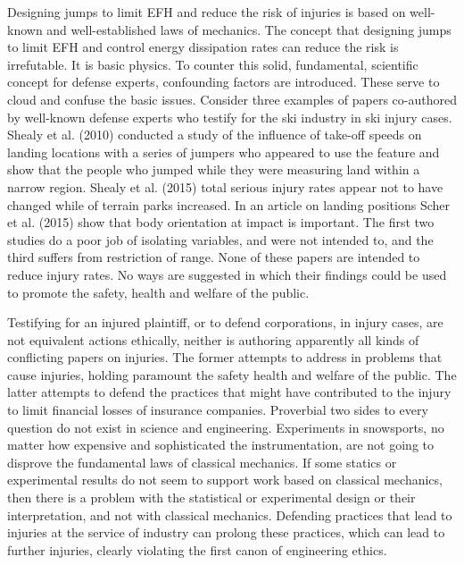 \documentclass{article}
\begin{document}
Designing jumps to limit EFH and reduce the risk of injuries is based on well-known and well-established laws of mechanics. The concept that designing jumps to limit EFH and control energy dissipation rates can reduce the risk is irrefutable. It is basic physics. To counter this solid, fundamental, scientific concept for defense experts, confounding factors are introduced. These serve to cloud and confuse the basic issues. Consider three examples of papers co-authored by well-known defense experts who testify for the ski industry in ski injury cases. Shealy et al. (2010) conducted a study of the influence of take-off speeds on landing locations with a series of jumpers who appeared to use the feature and show that the people who jumped while they were measuring land within a narrow region. Shealy et al. (2015) total serious injury rates appear not to have changed while of terrain parks increased. In an article on landing positions Scher et al. (2015) show that body orientation at impact is important. The first two studies do a poor job of isolating variables, and were not intended to, and the third suffers from restriction of range. None of these papers are intended to reduce injury rates. No ways are suggested in which their findings could be used to promote the safety, health and welfare of the public.

Testifying for an injured plaintiff, or to defend corporations, in injury cases, are not equivalent actions ethically, neither is authoring apparently all kinds of conflicting papers on injuries. The former attempts to address in problems that cause injuries, holding paramount the safety health and welfare of the public. The latter attempts to defend the practices that might have contributed to the injury to limit financial losses of insurance companies. Proverbial two sides to every question do not exist in science and engineering. Experiments in snowsports, no matter how expensive and sophisticated the instrumentation, are not going to disprove the fundamental laws of classical mechanics. If some statics or experimental results do not seem to support work based on classical mechanics, then there is a problem with the statistical or experimental design or their interpretation, and not with classical mechanics. Defending practices that lead to injuries at the service of industry can prolong these practices, which can lead to further injuries, clearly violating the first canon of engineering ethics.
\end{document}

